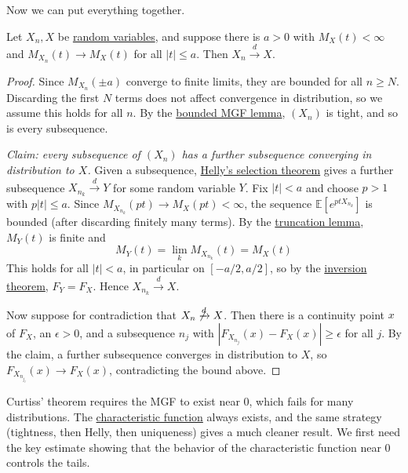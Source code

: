 	Now we can put everything together. 

	\begin{theorem}
	  \label{thm:curtiss-theorem}
		Let $X_n, X$ be \hyperref[def:random-variable]{random variables}, and suppose there is $a > 0$ with $M_X (t) < \infty$ and $M_{X_n} (t) \to M_X (t)$ for all $|t| \leq a$. Then $X_n \xrightarrow{d} X$. 
	\end{theorem}
	\begin{proof}
		Since $M_{X_n} (\pm a)$ converge to finite limits, they are bounded for all $n \geq N$. Discarding the first $N$ terms does not affect convergence in distribution, so we assume this holds for all $n$. By the \hyperref[thm:bounded-mgf-implies-tight]{bounded MGF lemma}, $(X_n)$ is tight, and so is every subsequence. 

		\textit{Claim: every subsequence of $(X_n)$ has a further subsequence converging in distribution to $X$.} Given a subsequence, \hyperref[thm:helly-selection-theorem]{Helly's selection theorem} gives a further subsequence $X_{n_k} \xrightarrow{d} Y$ for some random variable $Y$. Fix $|t| < a$ and choose $p > 1$ with $p |t| \leq a$. Since $M_{X_{n_k}} (p t) \to M_X (p t) < \infty$, the sequence $\mathbb{E}[e^{p t X_{n_k}}]$ is bounded (after discarding finitely many terms). By the \hyperref[thm:truncation-lemma]{truncation lemma}, $M_Y (t)$ is finite and 
		\begin{equation}
			M_Y (t) = \lim_k M_{X_{n_k}} (t) = M_X (t)
		\end{equation}
		This holds for all $|t| < a$, in particular on $[-a/2, a/2]$, so by the \hyperref[thm:inversion-theorem]{inversion theorem}, $F_Y = F_X$. Hence $X_{n_k} \xrightarrow{d} X$. 

		Now suppose for contradiction that $X_n \not\xrightarrow{d} X$. Then there is a continuity point $x$ of $F_X$, an $\epsilon > 0$, and a subsequence $n_j$ with $|F_{X_{n_j}} (x) - F_X (x)| \geq \epsilon$ for all $j$. By the claim, a further subsequence converges in distribution to $X$, so $F_{X_{n_{j_l}}} (x) \to F_X (x)$, contradicting the bound above. 
	\end{proof}

	Curtiss' theorem requires the MGF to exist near $0$, which fails for many distributions. The \hyperref[def:characteristic-function]{characteristic function} always exists, and the same strategy (tightness, then Helly, then uniqueness) gives a much cleaner result. We first need the key estimate showing that the behavior of the characteristic function near $0$ controls the tails. 

